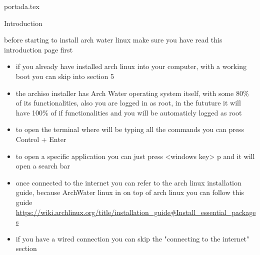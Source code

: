 
{portada.tex}
\newpage
\tableofcontents
\printindex
\newpage
\begin{section}{Introduction}
	\begin{center}
		\begin{Large}
			before starting to install arch water linux make sure you have read this introduction page first
		\end{Large}
	\end{center}
	\begin{itemize}
		\item 
			if you already have installed arch linux into your computer, with a working boot you can skip into section 5
		\item
			the archiso installer has Arch Water operating system itself, with some 80\% of its functionalities, 
			also you are logged in as root, in the fututure it will have 100\% of if functionalities and you will be automaticly logged as root
		\item
			to open the terminal where will be typing all the commands you can press Control + Enter
		\item 
			to open a specific application you can just press <windows key> p and it will open a search bar
		\item
			once connected to the internet you can refer to the arch linux installation guide, because ArchWater linux in on top of arch linux you can follow this guide
			\url{https://wiki.archlinux.org/title/installation_guide#Install_essential_packages}
		\item 
			if you have a wired connection you can skip the "connecting to the internet" section
	\end{itemize}
\end{section}
\newpage
